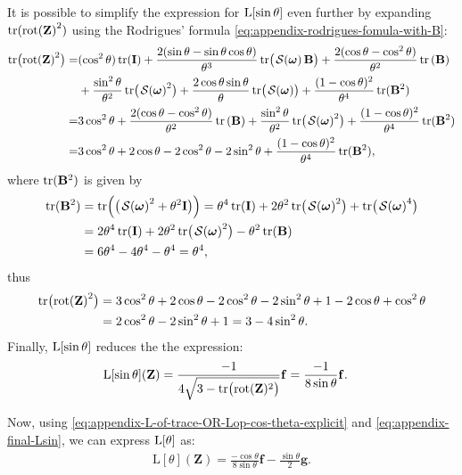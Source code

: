 It is possible to simplify the expression for $\operatorname{L}[\sin\theta]$ even further by expanding $\operatorname{tr}(\mathbf{\operatorname{rot}(\mathbf{Z})}^2)$ using the Rodrigues' formula \eqref{eq:appendix-rodrigues-fomula-with-B}:
\begin{align}
    \tr\bigl(\mathbf{\rot(\mathbf{Z})}^2\bigr) =& (\cos^2\theta)\tr(\mathbf{I}) + \frac{2(\sin\theta - \sin\theta\cos\theta)}{\theta^3}\tr\bigl(\SL[\boldsymbol{\omega}]\mathbf{B}\bigr) + \frac{2(\cos\theta - \cos^2\theta)}{\theta^2}\tr{(\mathbf{B})} \nonumber\\
    &+ \frac{\sin^2\theta}{\theta^2}\tr\bigl(\SL[\boldsymbol{\omega}]^2\bigr) + \frac{2\cos\theta\sin\theta}{\theta}\tr\bigl(\SL[\boldsymbol{\omega}]\bigr) + \frac{(1-\cos\theta)^2}{\theta^4}\tr(\mathbf{B}^2)\nonumber\\
    =& 3\cos^2\theta + \frac{2(\cos\theta - \cos^2\theta)}{\theta^2}\tr{(\mathbf{B})} + \frac{\sin^2\theta}{\theta^2}\tr\bigl(\SL[\boldsymbol{\omega}]^2\bigr) + \frac{(1-\cos\theta)^2}{\theta^4}\tr(\mathbf{B}^2)\nonumber\\
    =& 3\cos^2\theta + 2\cos\theta - 2\cos^2\theta -2\sin^2\theta + \frac{(1-\cos\theta)^2}{\theta^4}\tr(\mathbf{B}^2),
\end{align}
where $\operatorname{tr}(\mathbf{B}^2)$ is given by
\begin{align}
    \tr(\mathbf{B}^2) &= \tr\Bigl(\bigl(\SL[\boldsymbol{\omega}]^2 + \theta^2\mathbf{I}\bigr)\Bigr) = \theta^4\tr(\mathbf{I}) + 2\theta^2\tr\bigl(\SL[\boldsymbol{\omega}]^2\bigr) + \tr\bigl(\SL[\boldsymbol{\omega}]^4\bigr)\\
    &= 2\theta^4\tr(\mathbf{I}) + 2\theta^2\tr\bigl(\SL[\boldsymbol{\omega}]^2\bigr) - \theta^2\tr(\mathbf{B})\\
    &= 6\theta^4 - 4\theta^4 - \theta^4 = \theta^4,
\end{align}
thus
\begin{align}
    \operatorname{tr}\bigl(\mathbf{\operatorname{rot}(\mathbf{Z})}^2\bigr) &= 3\cos^2\theta + 2\cos\theta - 2\cos^2\theta -2\sin^2\theta + 1-2\cos\theta + \cos^2\theta\\
    &= 2\cos^2\theta -2\sin^2\theta + 1 = 3 - 4\sin^2\theta.
\end{align}
Finally, $\operatorname{L}[\sin\theta]$ reduces the the expression:
\begin{align}
    \operatorname{L}[\sin\theta](\mathbf{Z}) &= \frac{-1}{4\sqrt{3 - \operatorname{tr}\bigl(\operatorname{rot}(\mathbf{Z})^2\bigr)}}\mathbf{f} = \frac{-1}{8\sin\theta}\mathbf{f}. \label{eq:appendix-final-Lsin}
\end{align}

Now, using \eqref{eq:appendix-L-of-trace-OR-Lop-cos-theta-explicit} and \eqref{eq:appendix-final-Lsin}, we can express $\operatorname{L}[\theta]$ as:
\begin{align}
    \text{L}[\theta](\mathbf{Z}) = \frac{-\cos\theta}{8\sin\theta}\mathbf{f} - \frac{\sin\theta}{2}\mathbf{g}. \label{eq:appendix-final-Ltheta-f-g}
\end{align}

